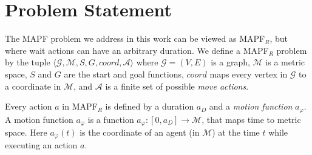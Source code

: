 \documentclass[review]{elsarticle}
\newcommand{\target}{\ensuremath{G}\xspace}
\newcommand{\source}{\ensuremath{S}\xspace}
\newcommand\konstantin[1]{\nb{\textbf{Konstantin:}}{red}{#1}}
\newcommand{\mapfr}{\ac{MAPF}$_R$\xspace}
\newcommand{\mapf}{\ac{MAPF}\xspace}
\newcommand{\true}{\textit{true}\xspace}
\newcommand{\false}{\textit{false}\xspace}
\newcommand{\coord}{\textit{coord}\xspace}
\newcommand{\iscollision}{\textsc{IsCollision}\xspace}
\begin{document}
\section{Problem Statement}
\label{sec:problem-statement}
The \mapf problem we address in this work can be viewed as \mapfr, but where wait actions can have an arbitrary duration.  
We define a \mapfr problem by the tuple $\langle \mathcal{G}, \mathcal{M}, \source, \target, \coord, \mathcal{A}\rangle$ 
where $\mathcal{G}=(V,E)$ is a graph, 
$\mathcal{M}$ is a metric space, 
$\source$ and $\target$ are the start and goal functions, 
$\coord$ maps every vertex in $\mathcal{G}$ to a coordinate in $\mathcal{M}$, 
and $\mathcal{A}$ is a finite set of possible \emph{move actions}.








Every action $a$ in \mapfr is defined by a duration $a_D$ and a \emph{motion function} $a_\varphi$. 
A motion function $a_\varphi$ is a function $a_\varphi:[0,a_D]\rightarrow \mathcal{M}$, that maps time to metric space. Here $a_\varphi(t)$ is the coordinate of an agent (in $\mathcal{M}$) at the time $t$ while executing an action $a$. 
\end{document}
